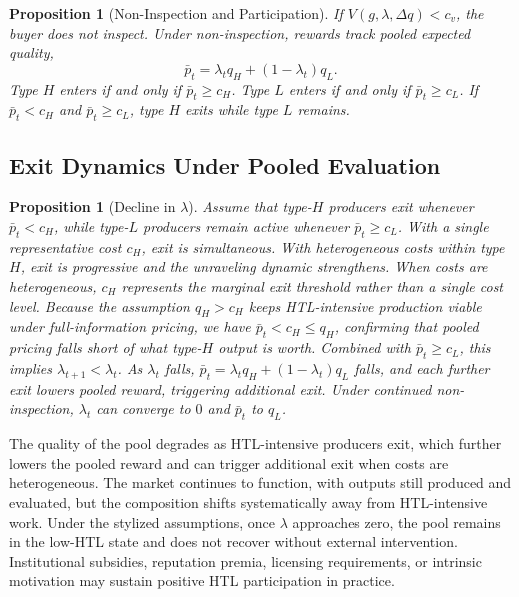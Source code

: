 \documentclass{article}
\theoremstyle{plain}
\newtheorem{proposition}[theorem]{Proposition}
\theoremstyle{definition}
\theoremstyle{remark}
\begin{document}
\begin{proposition}[Non-Inspection and Participation]
\label{prop:pooled}
If $V(g,\lambda,\Delta q) < c_v$, the buyer does not inspect. Under non-inspection, rewards track pooled expected quality,
\begin{equation}
\bar{p}_t = \lambda_t q_H + (1-\lambda_t) q_L.
\end{equation}
Type $H$ enters if and only if $\bar{p}_t \geq c_H$. Type $L$ enters if and only if $\bar{p}_t \geq c_L$. If $\bar{p}_t < c_H$ and $\bar{p}_t \geq c_L$, type $H$ exits while type $L$ remains.
\end{proposition}

\subsection{Exit Dynamics Under Pooled Evaluation}
\label{app:unraveling}

\begin{proposition}[Decline in $\lambda$]
\label{prop:unravel}
Assume that type-$H$ producers exit whenever $\bar{p}_t < c_H$, while type-$L$ producers remain active whenever $\bar{p}_t \geq c_L$. With a single representative cost $c_H$, exit is simultaneous. With heterogeneous costs within type $H$, exit is progressive and the unraveling dynamic strengthens. When costs are heterogeneous, $c_H$ represents the marginal exit threshold rather than a single cost level. Because the assumption $q_H > c_H$ keeps HTL-intensive production viable under full-information pricing, we have $\bar{p}_t < c_H \leq q_H$, confirming that pooled pricing falls short of what type-$H$ output is worth. Combined with $\bar p_t \ge c_L$, this implies $\lambda_{t+1} < \lambda_t$. As $\lambda_t$ falls, $\bar{p}_t = \lambda_t q_H + (1-\lambda_t) q_L$ falls, and each further exit lowers pooled reward, triggering additional exit. Under continued non-inspection, $\lambda_t$ can converge to $0$ and $\bar{p}_t$ to $q_L$.
\end{proposition}

The quality of the pool degrades as HTL-intensive producers exit, which further lowers the pooled reward and can trigger additional exit when costs are heterogeneous. The market continues to function, with outputs still produced and evaluated, but the composition shifts systematically away from HTL-intensive work. Under the stylized assumptions, once $\lambda$ approaches zero, the pool remains in the low-HTL state and does not recover without external intervention. Institutional subsidies, reputation premia, licensing requirements, or intrinsic motivation may sustain positive HTL participation in practice.
\end{document}
